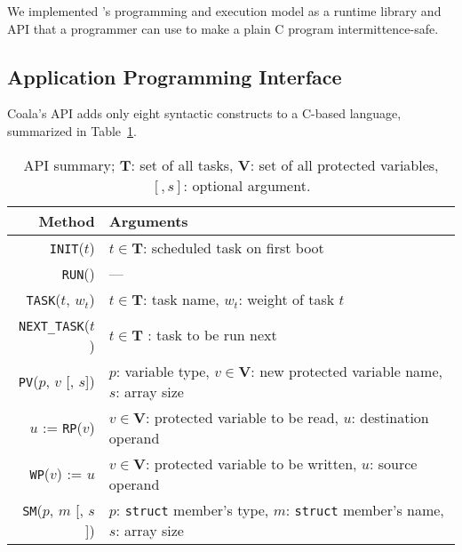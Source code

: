 We implemented \sys's programming and execution model as a runtime library and API that a programmer can use to make a plain C program intermittence-safe.

\subsection{Application Programming Interface}
\label{sec:coala_api}

Coala's API adds only eight syntactic constructs to a C-based language, summarized
in Table~\ref{table:coala_api}.


\begin{table}
\centering
\begin{tabular}{| r | p{} |}
	\hline
	{Method} & {Arguments} \\
	\hline\hline
	\texttt{INIT}($t$) & $t \in \mathbf{T}$: scheduled task on first boot \\
	\hline
	\texttt{RUN}() & --- \\
	\hline
	\texttt{TASK}($t$, $w_t$) & $t \in \mathbf{T}$: task name, $w_t$: weight of task $t$ \\
	\hline
	\texttt{NEXT\_TASK}($t$) & $t \in \mathbf{T}$ : task to be run next \\
	\hline
	\texttt{PV}($p$, $v$ [, $s$]) & $p$: variable type, $v \in \mathbf{V}$: new protected variable name, $s$: array size \\
	\hline
	$u$ := \texttt{RP}($v$) & $v \in \mathbf{V}$: protected variable to be read, $u$: destination operand \\
	\hline	
	\texttt{WP}($v$) := $u$ &  $v \in \mathbf{V}$: protected variable to be written, $u$: source operand \\
	\hline
	\texttt{SM}($p$, $m$ [, $s$]) & $p$: \texttt{struct} member's type, $m$: \texttt{struct} member's name, $s$: array size \\
	\hline
\end{tabular}
\caption{API summary; $\mathbf{T}$: set of all tasks, $\mathbf{V}$: set of all protected variables, $[, s]$: optional argument.}
\label{table:coala_api}
\end{table}

